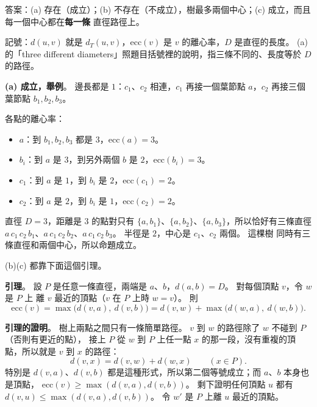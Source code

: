 \begin{pastsoln}
答案：(a) 存在（成立）；(b) 不存在（不成立），樹最多兩個中心；(c) 成立，而且每一個中心都在\textbf{每一條}
直徑路徑上。

記號：$d(u, v)$ 就是 $d_T(u, v)$，$\mathrm{ecc}(v)$ 是 $v$ 的離心率，$D$ 是直徑的長度。 (a) 的「three
different diameters」照題目括號裡的說明，指三條不同的、長度等於 $D$ 的路徑。

\textbf{(a) 成立，舉例}。 邊長都是 $1$：$c_1$、$c_2$ 相連，$c_1$ 再接一個葉節點 $a$，$c_2$ 再接三個葉節點
$b_1, b_2, b_3$。
\begin{center}
\end{center}
各點的離心率：
\begin{itemize}
\item $a$：到 $b_1, b_2, b_3$ 都是 $3$，$\mathrm{ecc}(a) = 3$。
\item $b_i$：到 $a$ 是 $3$，到另外兩個 $b$ 是 $2$，$\mathrm{ecc}(b_i) = 3$。
\item $c_1$：到 $a$ 是 $1$，到 $b_i$ 是 $2$，$\mathrm{ecc}(c_1) = 2$。
\item $c_2$：到 $a$ 是 $2$，到 $b_i$ 是 $1$，$\mathrm{ecc}(c_2) = 2$。
\end{itemize}
直徑 $D = 3$，距離是 $3$ 的點對只有 $\{a, b_1\}$、$\{a, b_2\}$、$\{a, b_3\}$，所以恰好有三條直徑
$a\,c_1\,c_2\,b_1$、$a\,c_1\,c_2\,b_2$、$a\,c_1\,c_2\,b_3$。 半徑是 $2$，中心是 $c_1$、$c_2$ 兩個。 這棵樹
同時有三條直徑和兩個中心，所以命題成立。

(b)(c) 都靠下面這個引理。

\textbf{引理}。 設 $P$ 是任意一條直徑，兩端是 $a$、$b$，$d(a, b) = D$。 對每個頂點 $v$，令 $w$ 是 $P$ 上
離 $v$ 最近的頂點（$v$ 在 $P$ 上時 $w = v$）。 則
\[
\mathrm{ecc}(v) = \max\bigl(d(v, a),\ d(v, b)\bigr) = d(v, w) + \max\bigl(d(w, a),\ d(w, b)\bigr).
\]

\textbf{引理的證明}。 樹上兩點之間只有一條簡單路徑。 $v$ 到 $w$ 的路徑除了 $w$ 不碰到 $P$（否則有更近的點），
接上 $P$ 從 $w$ 到 $P$ 上任一點 $x$ 的那一段，沒有重複的頂點，所以就是 $v$ 到 $x$ 的路徑：
\[
d(v, x) = d(v, w) + d(w, x) \qquad (x \in P). \tag{$*$}
\]
特別是 $d(v, a)$、$d(v, b)$ 都是這種形式，所以第二個等號成立；而 $a$、$b$ 本身也是頂點，
$\mathrm{ecc}(v) \ge \max(d(v, a), d(v, b))$。 剩下證明任何頂點 $u$ 都有
$d(v, u) \le \max(d(v, a), d(v, b))$。 令 $w'$ 是 $P$ 上離 $u$ 最近的頂點。


\end{pastsoln}
